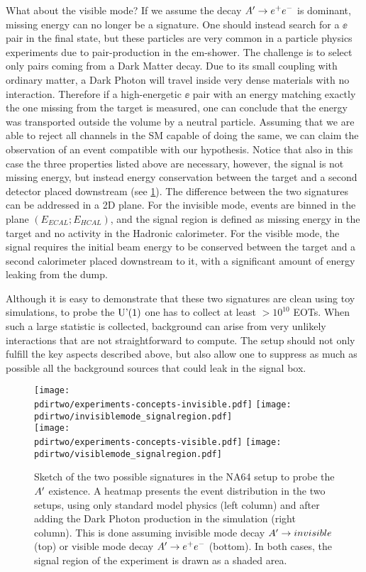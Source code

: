 What about the visible mode? If we assume the decay $A' \to e^+e^-$ is dominant, missing energy can no longer be a signature. One should instead search for a $\ee$ pair in the final state, but these particles are very common in a particle physics experiments due to pair-production in the em-shower. The challenge is to select only pairs coming from a Dark Matter decay. Due to its small coupling with ordinary matter, a Dark Photon will travel inside very dense materials with no interaction. Therefore if a high-energetic $\ee$ pair with an energy matching exactly the one missing from the target is measured, one can conclude that the energy was transported outside the volume by a neutral particle. Assuming that we are able to reject all channels in the SM capable of doing the same, we can claim the observation of an event compatible with our hypothesis. Notice that also in this case the three properties listed above are necessary, however, the signal is not missing energy, but instead energy conservation between the target and a second detector placed downstream (see \ref{fig:two-signature}).
The difference between the two signatures can be addressed in a 2D plane. For the invisible mode, events are binned in the plane $(E_{ECAL};E_{HCAL})$, and the signal region is defined as missing energy in the target and no activity in the Hadronic calorimeter. For the visible mode, the signal requires the initial beam energy to be conserved between the target and a second calorimeter placed downstream to it, with a significant amount of energy leaking from the dump.

Although it is easy to demonstrate that these two signatures are clean using toy simulations, to probe the $\textrm{U'(1)}$ one has to collect at least $>10^{10}$ EOTs. When such a large statistic is collected, background can arise from very unlikely interactions that are not straightforward to compute. The setup should not only fulfill the key aspects described above, but also allow one to suppress as much as possible all the background sources that could leak in the signal box.

\begin{figure}[bth!]
  \centering
  \texttt{[image: \\pdirtwo/experiments-concepts-invisible.pdf]}
  \texttt{[image: \\pdirtwo/invisiblemode\_signalregion.pdf]} \\
  \texttt{[image: \\pdirtwo/experiments-concepts-visible.pdf]}
  \texttt{[image: \\pdirtwo/visiblemode\_signalregion.pdf]}   
\caption[Sketch of experimental signatures for $\DM$]{Sketch of the two possible signatures in the NA64 setup to probe the $\DM$ existence. A heatmap presents the event distribution in the two setups, using only standard model physics (left column) and after adding the Dark Photon production in the simulation (right column). This is done assuming invisible mode decay $A'\to invisible$ (top) or visible mode decay $A' \to e^+e^-$ (bottom). In both cases, the signal region of the experiment is drawn as a shaded area.}
\label{fig:two-signature}
\end{figure}

